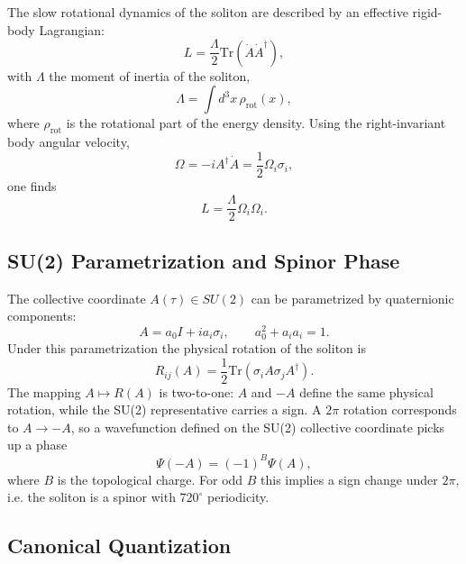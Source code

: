 ﻿\documentclass[11pt,a4paper]{article}
\begin{document}
The slow rotational dynamics of the soliton are described by an effective rigid-body Lagrangian:
\begin{equation}
L = \frac{\Lambda}{2} \text{Tr}(\dot A \dot A^\dagger),
\end{equation}
with $\Lambda$ the moment of inertia of the soliton,
\begin{equation}
\Lambda = \int d^3x\, \rho_{\text{rot}}(x),
\end{equation}
where $\rho_{\text{rot}}$ is the rotational part of the energy density. Using the right-invariant body angular velocity,
\begin{equation}
\Omega = -i A^\dagger \dot A = \frac{1}{2}\Omega_i \sigma_i,
\end{equation}
one finds
\begin{equation}
L = \frac{\Lambda}{2} \Omega_i \Omega_i.
\end{equation}

\subsection{SU(2) Parametrization and Spinor Phase}

The collective coordinate $A(\tau) \in SU(2)$ can be parametrized by quaternionic components:
\begin{equation}
A = a_0 I + i a_i \sigma_i,
\qquad a_0^2 + a_i a_i = 1.
\end{equation}
Under this parametrization the physical rotation of the soliton is
\begin{equation}
R_{ij}(A) = \frac{1}{2} \text{Tr}(\sigma_i A \sigma_j A^\dagger).
\end{equation}
The mapping $A \mapsto R(A)$ is two-to-one: $A$ and $-A$ define the same physical rotation, while the SU(2) representative carries a sign. A $2\pi$ rotation corresponds to $A \to -A$, so a wavefunction defined on the SU(2) collective coordinate picks up a phase
\begin{equation}
\Psi(-A) = (-1)^B \Psi(A),
\end{equation}
where $B$ is the topological charge. For odd $B$ this implies a sign change under $2\pi$, i.e. the soliton is a spinor with $720^\circ$ periodicity.

\subsection{Canonical Quantization}
\end{document}
